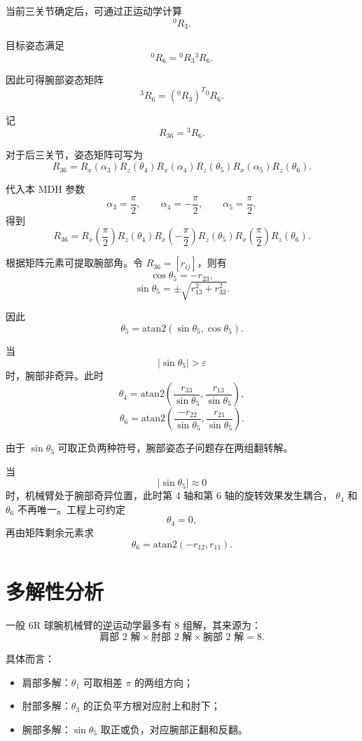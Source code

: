 \documentclass[UTF8,a4paper,12pt]{ctexart}
\begin{document}
当前三关节确定后，可通过正运动学计算
\[
{}^0R_3.
\]

目标姿态满足
\[
{}^0R_6={}^0R_3{}^3R_6.
\]

因此可得腕部姿态矩阵
\[
{}^3R_6=({}^0R_3)^T{}^0R_6.
\]

记
\[
R_{36}={}^3R_6.
\]

对于后三关节，姿态矩阵可写为
\[
R_{36}
=R_x(\alpha_3)R_z(\theta_4)
 R_x(\alpha_4)R_z(\theta_5)
 R_x(\alpha_5)R_z(\theta_6).
\]

代入本 MDH 参数
\[
\alpha_3=\frac{\pi}{2},\qquad
\alpha_4=-\frac{\pi}{2},\qquad
\alpha_5=\frac{\pi}{2},
\]
得到
\[
R_{36}
=R_x\left(\frac{\pi}{2}\right)R_z(\theta_4)
R_x\left(-\frac{\pi}{2}\right)R_z(\theta_5)
R_x\left(\frac{\pi}{2}\right)R_z(\theta_6).
\]

根据矩阵元素可提取腕部角。令 $R_{36}=[r_{ij}]$，则有
\[
\cos\theta_5=-r_{23},
\]
\[
\sin\theta_5=\pm\sqrt{r_{13}^2+r_{33}^2}.
\]

因此
\[
\theta_5=\mathrm{atan2}(\sin\theta_5,\cos\theta_5).
\]

当
\[
|\sin\theta_5|>\varepsilon
\]
时，腕部非奇异。此时
\[
\theta_4=
\mathrm{atan2}
\left(
\frac{r_{33}}{\sin\theta_5},
\frac{r_{13}}{\sin\theta_5}
\right),
\]
\[
\theta_6=
\mathrm{atan2}
\left(
\frac{-r_{22}}{\sin\theta_5},
\frac{r_{21}}{\sin\theta_5}
\right).
\]

由于 $\sin\theta_5$ 可取正负两种符号，腕部姿态子问题存在两组翻转解。

当
\[
|\sin\theta_5|\approx 0
\]
时，机械臂处于腕部奇异位置，此时第 4 轴和第 6 轴的旋转效果发生耦合，
$\theta_4$ 和 $\theta_6$ 不再唯一。工程上可约定
\[
\theta_4=0,
\]
再由矩阵剩余元素求
\[
\theta_6=\mathrm{atan2}(-r_{12},r_{11}).
\]

\section{多解性分析}

一般 6R 球腕机械臂的逆运动学最多有 8 组解，其来源为：
\[
\text{肩部 2 解}\times
\text{肘部 2 解}\times
\text{腕部 2 解}
=8.
\]

具体而言：

\begin{itemize}
    \item 肩部多解：$\theta_1$ 可取相差 $\pi$ 的两组方向；
    \item 肘部多解：$\theta_3$ 的正负平方根对应肘上和肘下；
    \item 腕部多解：$\sin\theta_5$ 取正或负，对应腕部正翻和反翻。
\end{itemize}
\end{document}
